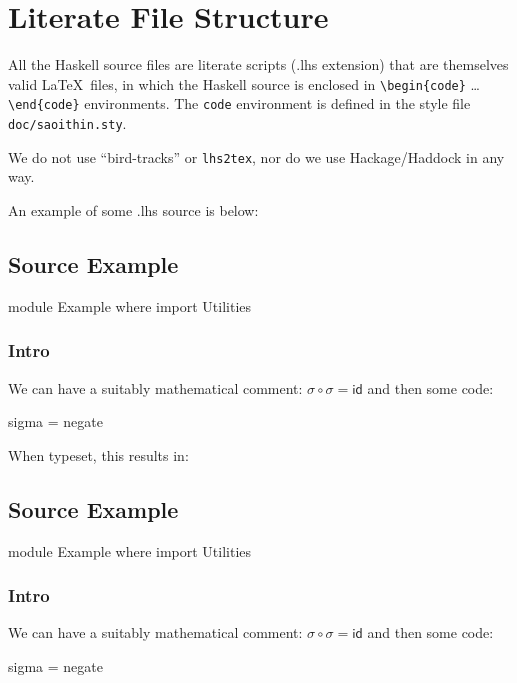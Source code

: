 \section{Literate File Structure}

All the Haskell source files are literate scripts
(.lhs extension) that are themselves valid \LaTeX\ files,
in which the Haskell source is enclosed in
\verb"\begin{code}" \ldots \verb"\end{code}" environments.
The \texttt{code} environment is defined in the style file \texttt{doc/saoithin.sty}.

We do not use ``bird-tracks'' or \texttt{lhs2tex},
nor do we use Hackage/Haddock in any way.

\newpage
\begin{haskell}
An example of some .lhs source is below:
\subsection{ Source Example}

\begin{code}
module Example where
import Utilities
\end{code}

\subsubsection{Intro}

We can have a suitably mathematical comment:
$\sigma \circ \sigma = \mathsf{id}$
and then some code:
\begin{code}
sigma = negate
\end{code}
\end{haskell}
When typeset, this results in:

\subsection{ Source Example}

\begin{code}
module Example where
import Utilities
\end{code}

\subsubsection{Intro}

We can have a suitably mathematical comment:
$\sigma \circ \sigma = \mathsf{id}$
and then some code:
\begin{code}
sigma = negate
\end{code}

